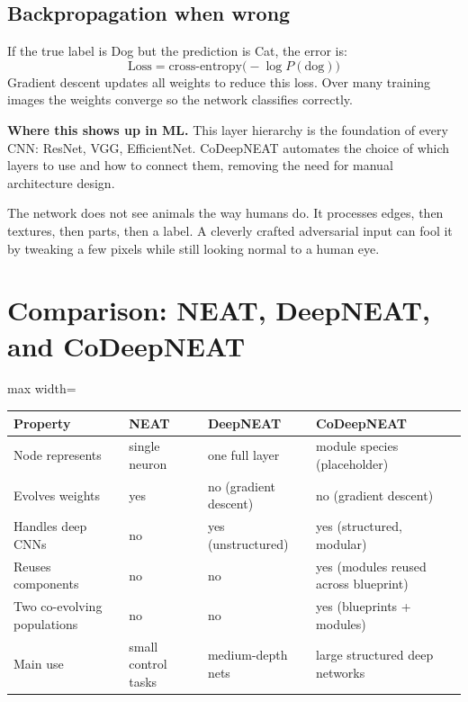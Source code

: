 \documentclass[a4paper,11pt]{article}
\begin{document}
\subsection{Backpropagation when wrong}

If the true label is Dog but the prediction is Cat, the error is:
\[
  \text{Loss} = \text{cross-entropy}\bigl(-\log P(\text{dog})\bigr)
\]
Gradient descent updates all weights to reduce this loss.
Over many training images the weights converge so the network
classifies correctly.

\textbf{Where this shows up in ML.}
This layer hierarchy is the foundation of every CNN: ResNet, VGG,
EfficientNet.
CoDeepNEAT automates the choice of which layers to use and how to
connect them, removing the need for manual architecture design.

\begin{watchout}
The network does not see animals the way humans do.
It processes edges, then textures, then parts, then a label.
A cleverly crafted adversarial input can fool it by tweaking a few
pixels while still looking normal to a human eye.
\end{watchout}

\section{Comparison: NEAT, DeepNEAT, and CoDeepNEAT}

\begin{adjustbox}{max width=\linewidth}
\begin{tabular}{@{}p{3cm}p{3.3cm}p{3.3cm}p{3.6cm}@{}}
\toprule
\textbf{Property} & \textbf{NEAT} & \textbf{DeepNEAT} & \textbf{CoDeepNEAT} \\
\midrule
Node represents & single neuron & one full layer & module species (placeholder) \\
Evolves weights & yes & no (gradient descent) & no (gradient descent) \\
Handles deep CNNs & no & yes (unstructured) & yes (structured, modular) \\
Reuses components & no & no & yes (modules reused across blueprint) \\
Two co-evolving populations & no & no & yes (blueprints + modules) \\
Main use & small control tasks & medium-depth nets & large structured deep networks \\
\bottomrule
\end{tabular}
\end{adjustbox}
\end{document}

